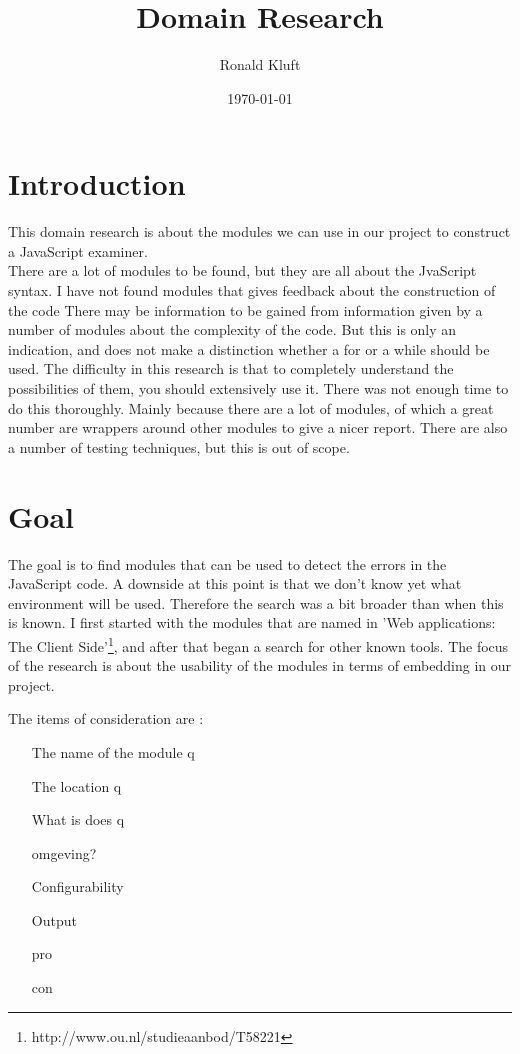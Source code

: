 \documentclass{article}
\begin{document}
\title{Domain Research}
\author{Ronald Kluft}
\date{\today}
\maketitle

\section{Introduction}

This domain research is about the modules we can use in our project to construct a JavaScript examiner.\\
There are a lot of modules to be found, but they are all about the JvaScript syntax.
I have not found modules that gives feedback about the construction of the code
There may be information to be gained from information given by a number of modules about the complexity of the code. 
But this is only an indication, and does not make a distinction whether a for or a while should be used.
The difficulty in this research is that to completely understand the possibilities of them, you should extensively use it.
There was not enough time to do this thoroughly.
Mainly because there are a lot of modules, of which a great number are wrappers around other modules to give a nicer report.
There are also a number of testing techniques, but this is out of scope.

\section{Goal}
The goal is to find modules that can be used to detect the errors in the JavaScript code.
A downside at this point is that we don't know yet what environment will be used.
Therefore the search was a bit broader than when this is known.
I first started with the modules that are named in 'Web applications: The Client Side'\footnote{http://www.ou.nl/studieaanbod/T58221}, and after that began a search for other known tools.
The focus of the research is about the usability of the modules in terms of embedding in our project.

The items of consideration are :\\
\begin{itemize}
\item[The name of the module]q
\item[The location]q
\item[What is does]q
\item[omgeving?]
\item[Configurability]
\item[Output]
\item[pro]
\item[con]
\end{itemize}
\end{document}
